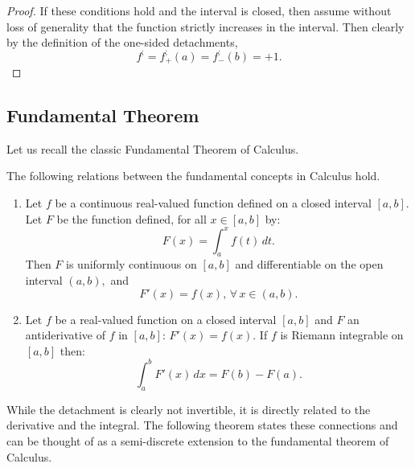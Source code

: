\documentclass[11pt]{book}
\begin{document}
\begin{proof}
If these conditions hold and the interval is closed, then assume without loss of generality that the function strictly increases in the interval. Then clearly by the definition of the one-sided detachments,
$$f^{;}=f^{;}_{+}\left(a\right)=f^{;}_{-}\left(b\right)=+1.$$
\end{proof}

\subsection{Fundamental Theorem}
\label{fundamental_section}
Let us recall the classic Fundamental Theorem of Calculus.
\begin{theorem}The following relations between the fundamental concepts in Calculus hold.
\begin{enumerate}
    \item 
    Let $f$ be a continuous real-valued function defined on a closed interval $[a,b]$. Let $F$ be the function defined, for all $x\in\left[a,b\right]$ by: 
$${\displaystyle F(x)=\int_{a}^{x}\!f(t)\,dt.}$$
Then $F$ is uniformly continuous on $[a,b]$ and differentiable on the open interval $(a,b),$ and
$${\displaystyle F'(x)=f(x),\,}\forall\,x\in\left(a,b\right).$$
    
    \item 
    Let $f$ be a real-valued function on a closed interval $\left[a,b\right]$ and $F$ an antiderivative of $f$ in $\left[a,b\right]$: $F'(x)=f(x)$.     If $f$ is Riemann integrable on $\left[a,b\right]$ then:
$$\int_{a}^{b}F'(x)\,dx=F(b)-F(a).$$
    \end{enumerate}
\label{ftc_1d}
\end{theorem}

While the detachment is clearly not invertible, it is directly related to the derivative and the integral. The following theorem states these connections and can be thought of as a semi-discrete extension to the fundamental theorem of Calculus.
\end{document}
